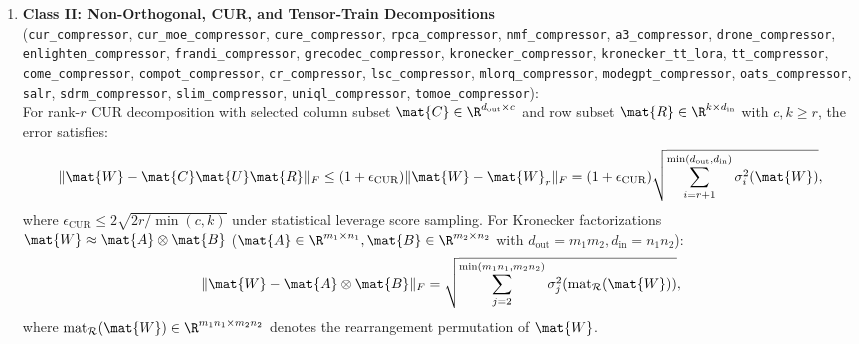 \begin{theorem}
\begin{enumerate}
    \item \textbf{Class II: Non-Orthogonal, CUR, and Tensor-Train Decompositions} \\
    (\texttt{cur\_compressor}, \texttt{cur\_moe\_compressor}, \texttt{cure\_compressor}, \texttt{rpca\_compressor}, \texttt{nmf\_compressor}, \texttt{a3\_compressor}, \texttt{drone\_compressor}, \texttt{enlighten\_compressor}, \texttt{frandi\_compressor}, \texttt{grecodec\_compressor}, \texttt{kronecker\_compressor}, \texttt{kronecker\_tt\_lora}, \texttt{tt\_compressor}, \texttt{come\_compressor}, \texttt{compot\_compressor}, \texttt{cr\_compressor}, \texttt{lsc\_compressor}, \texttt{mlorq\_compressor}, \texttt{modegpt\_compressor}, \texttt{oats\_compressor}, \texttt{salr}, \texttt{sdrm\_compressor}, \texttt{slim\_compressor}, \texttt{uniql\_compressor}, \texttt{tomoe\_compressor}): \\
    For rank-$r$ CUR decomposition with selected column subset $\mat{C} \in \R^{d_{\text{out}} \times c}$ and row subset $\mat{R} \in \R^{k \times d_{\text{in}}}$ with $c, k \ge r$, the error satisfies:
    \begin{equation}
    \|\mat{W} - \mat{C} \mat{U} \mat{R}\|_F \le (1 + \epsilon_{\text{CUR}}) \|\mat{W} - \mat{W}_r\|_F = (1 + \epsilon_{\text{CUR}}) \sqrt{\sum_{i=r+1}^{\min(d_{\text{out}}, d_{\text{in}})} \sigma_i^2(\mat{W})},
    \label{eq:bound_class2_cur}
    \end{equation}
    where $\epsilon_{\text{CUR}} \le 2\sqrt{2 r / \min(c, k)}$ under statistical leverage score sampling. For Kronecker factorizations $\mat{W} \approx \mat{A} \otimes \mat{B}$ ($\mat{A} \in \R^{m_1 \times n_1}, \mat{B} \in \R^{m_2 \times n_2}$ with $d_{\text{out}} = m_1 m_2, d_{\text{in}} = n_1 n_2$):
    \begin{equation}
    \|\mat{W} - \mat{A} \otimes \mat{B}\|_F = \sqrt{\sum_{j=2}^{\min(m_1 n_1, m_2 n_2)} \sigma_j^2(\operatorname{mat}_{\mathcal{R}}(\mat{W}))},
    \label{eq:bound_class2_kronecker}
    \end{equation}
    where $\operatorname{mat}_{\mathcal{R}}(\mat{W}) \in \R^{m_1 n_1 \times m_2 n_2}$ denotes the rearrangement permutation of $\mat{W}$.


\end{enumerate}
\end{theorem}
